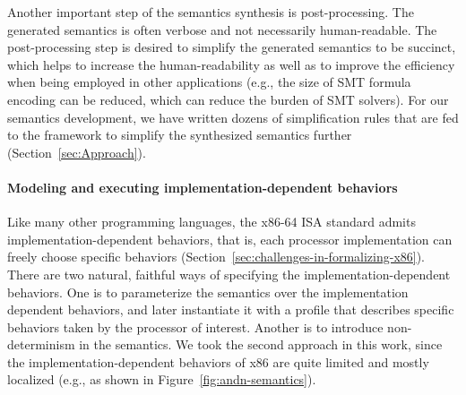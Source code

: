 {%
%
%


Another important step of the semantics synthesis is post-processing. The generated semantics is often verbose and not necessarily human-readable. The post-processing step is desired to simplify the generated semantics to be succinct, which helps to increase the human-readability as well as to improve the efficiency when being employed in other applications (e.g., the size of SMT formula encoding can be reduced, which can reduce the burden of SMT solvers). For our semantics development, we have written dozens of simplification rules that are fed to the \K framework to simplify the synthesized semantics further (Section~\ref{sec:Approach}).

\paragraph{Modeling and executing implementation-dependent behaviors}

Like many other programming languages, the x86-64 ISA standard admits implementation-dependent behaviors, that is, each processor implementation can freely choose specific behaviors (Section~\ref{sec:challenges-in-formalizing-x86}).
There are two natural, faithful ways of specifying the implementation-dependent behaviors.
One is to parameterize the semantics over the implementation dependent behaviors, and later instantiate it with a profile that describes specific behaviors taken by the processor of interest.
Another is to introduce non-determinism in the semantics.
We took the second approach in this work, since the implementation-dependent behaviors of x86 are quite limited and mostly localized (e.g., as shown in Figure~\ref{fig:andn-semantics}).

}
